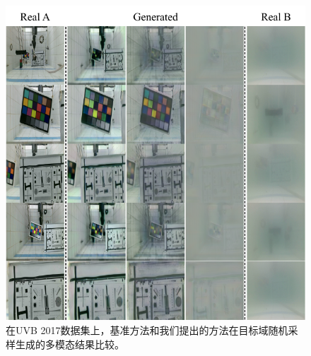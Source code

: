 \begin{figure}[htp]
    \centering
	\includegraphics[width=\textwidth]{figures/UVB_random.pdf}
	\caption{在UVB 2017数据集上，基准方法和我们提出的方法在目标域随机采样生成的多模态结果比较。}
	\label{fig:uvb_random}
\end{figure}

